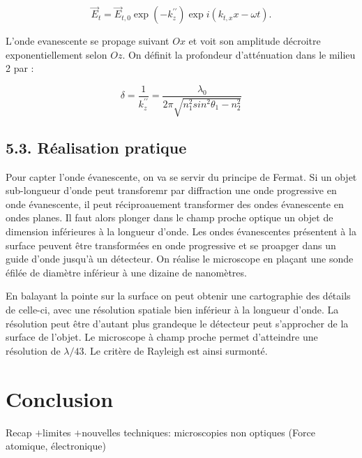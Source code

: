 \documentclass[french, a4paper, 10pt, twocolumn, landscape]{article}
\begin{document}
\begin{equation}
	\vec{E}_t=\vec{E}_{t,0}\exp{(-k_z^{\prime\prime})}\exp{i(k_{t,x}x-\omega t)}.
\end{equation}

L'onde evanescente se propage suivant $Ox$ et voit son amplitude décroitre exponentiellement selon $Oz$. On définit la profondeur d'atténuation dans le milieu 2 par : 

\begin{equation}
	\delta = \frac{1}{k_z^{\prime\prime}}=\dfrac{\lambda_0}{2\pi\sqrt{n_1^2sin^2\theta_1-n_2^2}}
\end{equation}

\subsection*{5.3. Réalisation pratique}

Pour capter l'onde évanescente, on va se servir du principe de Fermat. Si un objet sub-longueur d'onde  peut transforemr par diffraction une onde progressive en onde évanescente, il peut réciproauement transformer des ondes évanescente en ondes planes. Il faut alors plonger dans le champ proche optique un objet de dimension inférieures à la longueur d'onde. Les ondes évanescentes présentent à la surface peuvent être transformées en onde progressive et se proapger dans un guide d'onde jusqu'à un détecteur. On réalise le microscope en plaçant une sonde éfilée de diamètre inférieur à une dizaine de nanomètres.\medskip

En balayant la pointe sur la surface on peut obtenir une cartographie des détails de celle-ci, avec une résolution spatiale bien inférieur à la longueur d'onde. La résolution peut être d'autant plus grandeque le détecteur peut s'approcher de la surface de l'objet. Le microscope à champ proche permet d'atteindre une résolution de $\lambda /43$. Le critère de Rayleigh est ainsi surmonté.
\section*{Conclusion}

Recap $+$limites $+$nouvelles techniques: microscopies non optiques (Force atomique, électronique)

\clearpage
\end{document}

